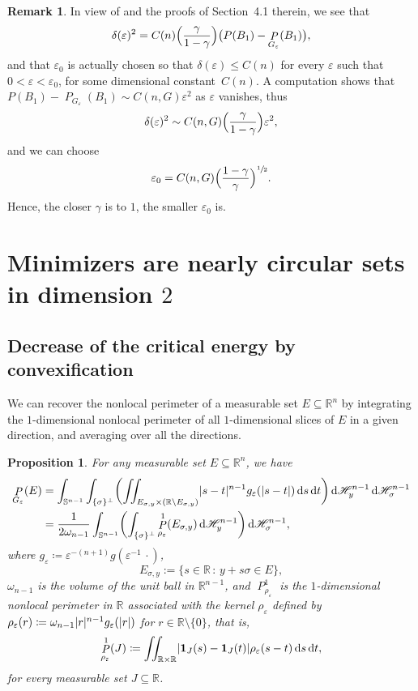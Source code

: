 \documentclass[JEP,XML,SOM,Unicode,published]{cedram}
\newcommand{\sep}{\,:\,}
\numberwithin{equation}{section}
\theoremstyle{plain}
\newtheorem{prp}[thm]{Proposition}
\theoremstyle{definition}
\newtheorem{rmk}[thm]{Remark}
\newcommand{\numberset}[1]{{\mathbb{#1}}}
\newcommand{\R}{\numberset{R}}
\newcommand{\dt}{\mathop{}\mathopen{}\mathrm{d}t}
\newcommand{\ds}{\mathop{}\mathopen{}\mathrm{d}s}
\newcommand{\dH}{\mathop{}\mathopen{}\mathrm{d}\mathscr{H}}
\newcommand{\bbS}{\mathbb{S}}
\let\om\omega
\let\eps\varepsilon
\newcommand{\ind}{{\mathbf{1}}}
\newcommand{\Ren}{{\R^n}}
\newcommand{\subsq}{\subseteq}
\DeclareMathOperator{\Per}{\mathit{P}}
\DeclarePairedDelimiter{\abs}{\lvert}{\rvert}
\begin{document}
\begin{rmk}\label{rmk:distball}
In view of \cite[Lem.\,4.1]{Peg2021} and the proofs of Section~4.1 therein, we see that
\[
\delta(\eps)^2 = C(n)\Bigl(\frac{\gamma}{1-\gamma}\Bigr)\big(P(B_1)-\Per_{G_\eps}(B_1)\big),
\]
and that $\eps_0$ is actually chosen so that $\delta(\eps)\leq C(n)$ for every $\eps$ such that $0<\eps<\eps_0$, for
some dimensional constant~$C(n)$.
A computation shows that $P(B_1)-\Per_{G_\eps}(B_1)\sim C(n,G)\eps^2$ as $\eps$ vanishes, thus
\[
\delta(\eps)^2 \sim C(n,G)\Bigl(\frac{\gamma}{1-\gamma}\Bigr)\eps^2,
\]
and we can choose
\[
\eps_0=C(n,G)\Bigl(\frac{1-\gamma}{\gamma}\Bigr)^{\sfrac{1}{2}}.
\]
Hence, the closer $\gamma$ is to $1$, the smaller $\eps_0$ is.
\end{rmk}

\section{Minimizers are nearly circular sets in dimension \texorpdfstring{$2$}{2}}
\label{sec:minnearlycirc}

\subsection{Decrease of the critical energy by convexification}\label{subsec:convexification}

We can recover the nonlocal perimeter of a measurable set $E\subsq\Ren$ by integrating the
$1$-dimensional nonlocal perimeter of all $1$-dimensional slices of $E$ in a given direction, and
averaging over all the directions.

\begin{prp}
For any measurable set $E\subsq\R^{n}$, we have
\[
\begin{aligned}
\Per_{G_\eps}(E)
&=\int_{\bbS^{n-1}} \int_{\{\sigma\}^\perp} \biggl(\iint_{E_{\sigma,y}\times
\left(\R\setminus E_{\sigma,y}\right)} \abs{s-t}^{n-1}g_\eps(\abs{s-t})\ds\dt\biggr)
\dH^{n-1}_y\dH^{n-1}_\sigma\\
&=\frac{1}{2\om_{n-1}}\int_{\bbS^{n-1}}\biggl(\int_{\{\sigma\}^\perp}
\Per^{1}_{\rho_\eps}(E_{\sigma,y}) \dH^{n-1}_y\biggr)\dH^{n-1}_\sigma,
\end{aligned}
\]
where $g_\eps\coloneqq\eps^{-(n+1)}g(\eps^{-1}\,\cdot)$,
\begin{equation}\label{eq:defEst}
E_{\sigma,y} := \bigl\{ s\in\R\sep  y+s\sigma\in E\bigr\},
\end{equation}
$\om_{n-1}$ is the volume of the unit ball in $\R^{n-1}$, and $\Per^{1}_{\rho_\eps}$ is the
$1$-dimensional nonlocal perimeter in $\R$ associated with the kernel $\rho_\eps$ defined by
$\rho_\eps(r)\coloneqq \om_{n-1}\abs{r}^{n-1}g_\eps(\abs{r})$ for $r\in\R\setminus\{0\}$, that is,
\[
\Per^1_{\rho_\eps}(J) \coloneqq \iint_{\R\times\R} \abs{\ind_J(s)-\ind_J(t)} \rho_\eps(s-t)\ds\dt,
\]
for every measurable set $J\subsq\R$.
\end{prp}
\end{document}
